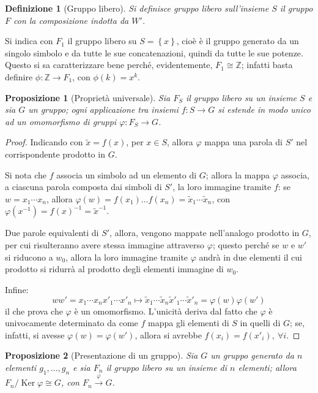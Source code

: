 \documentclass[12pt]{scrartcl}
\theoremstyle{style}
\newtheorem{definizione}{Definizione}[section]
\newtheorem{prop}{Proposizione}[section]
\numberwithin{equation}{subsection}
\begin{document}
\begin{definizione}
	[Gruppo libero]
	Si definisce \textit{gruppo libero sull'insieme} $S$ il gruppo $F$ con la composizione indotta da $W'$.
\end{definizione}
\noindent Si indica con $F_1$ il gruppo libero su $S = \left\{ x \right\} $, cio\`e \`e il gruppo generato da un singolo simbolo e da tutte le sue concatenazioni, quindi da tutte le sue potenze.
Questo si sa caratterizzare bene perch\'e, evidentemente, $F_1 \cong \mathbb{Z}$; infatti basta definire $\phi :\mathbb{Z}\to F_1$, con $\phi (k) = x^k$.

\begin{prop}
	[Propriet\`a universale]
	Sia $F_S$ il gruppo libero su un insieme $S$ e sia $G$ un gruppo; ogni applicazione tra insiemi $f: S \to G$ si estende in modo unico ad un omomorfismo di gruppi $\varphi : F_S \to G$.
\end{prop}
	\begin{proof} 
Indicando con $\widetilde{x}=f(x)$, per $x \in S$, allora $\varphi $ mappa una parola di $S'$ nel corrispondente prodotto in $G$.

Si nota che $f$ associa un simbolo ad un elemento di $G$; allora la mappa $\varphi $ associa, a ciascuna parola composta dai simboli di $S'$, la loro immagine tramite $f$: se $w = x_1 \cdots x_n$, allora $\varphi (w) = f(x_1) \ldots f(x_n)=\widetilde{x}_1 \cdots \widetilde{x}_n$, con $\varphi (x^{-1})=f(x)^{-1} = \widetilde{x}^{-1}$.

Due parole equivalenti di $S'$, allora, vengono mappate nell'analogo prodotto in $G$, per cui risulteranno avere stessa immagine attraverso $\varphi $; questo perch\'e se $w$ e $w'$ si riducono a $w_0$, allora la loro immagine tramite $\varphi $ andr\`a in due elementi il cui prodotto si ridurr\`a al prodotto degli elementi immagine di $w_0$.

Infine:
\[
w w'=x_1\cdots x_n x'_1\cdots x'_n\longmapsto \widetilde{x}_1 \cdots \widetilde{x}_n \widetilde{x}'_1 \cdots \widetilde{x}'_n= \varphi (w)\varphi (w')
\] 
il che prova che $\varphi $ \`e un omomorfismo.
L'unicit\`a deriva dal fatto che $\varphi $ \`e univocamente determinato da come $f$ mappa gli elementi di $S$ in quelli di $G$; se, infatti, si avesse $\varphi (w) = \varphi (w')$, allora si avrebbe $f(x_i) = f(x'_i), \ \forall i$.
	\end{proof}
\begin{prop}
	[Presentazione di un gruppo]
	Sia $G$ un gruppo generato da $n$ elementi $g_1,\ldots,g_n$ e sia $F_n$ il gruppo libero su un insieme di $n$ elementi; allora $F_n / \operatorname{Ker} \varphi  \cong G$, con $F_n \stackrel{\varphi }{\longrightarrow} G$.
\end{prop}
\end{document}
